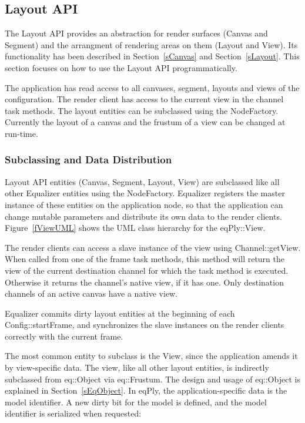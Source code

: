 \documentclass[10pt,a4]{scrartcl}
\newcommand{\fig}[1]{Figure~\ref{#1}}
\newcommand{\sref}[1]{Section~\ref{#1}}
\begin{document}
\subsection{\label{sLayoutAPI}Layout API}

The Layout API provides an abstraction for render surfaces (Canvas and
Segment) and the arrangment of rendering areas on them (Layout and
View). Its functionality has been described in \sref{sCanvas} and
\sref{sLayout}. This section focuses on how to use the Layout API
programmatically. 

The application has read access to all canvases, segment, layouts and
views of the configuration. The render client has access to the current
view in the channel task methods. The layout entities can be subclassed
using the \textsf{NodeFactory}. Currently the layout of a canvas and the
frustum of a view can be changed at run-time.


\subsubsection{Subclassing and Data Distribution}

Layout API entities (Canvas, Segment, Layout, View) are subclassed like
all other Equalizer entities using the \textsf{NodeFactory}. Equalizer
registers the master instance of these entities on the application node,
so that the application can change mutable parameters and distribute its
own data to the render clients. \fig{fViewUML} shows the UML class
hierarchy for the \textsf{eqPly::View}.

The render clients can access a slave instance of the view using
\textsf{Channel::getView}. When called from one of the frame task
methods, this method will return the view of the current destination
channel for which the task method is executed. Otherwise it returns the
channel's native view, if it has one. Only destination channels of an
active canvas have a native view.

Equalizer commits dirty layout entities at the beginning of each
\textsf{Config::startFrame}, and synchronizes the slave instances on the
render clients correctly with the current frame.

The most common entity to subclass is the \textsf{View}, since the
application amends it by view-specific data. The view, like all other
layout entities, is indirectly subclassed from \textsf{eq::Object} via
\textsf{eq::Frustum}. The design and usage of \textsf{eq::Object} is
explained in \sref{sEqObject}. In \textsf{eqPly}, the
application-specific data is the model identifier. A new dirty bit for
the model is defined, and the model identifier is serialized when
requested:
\end{document}
